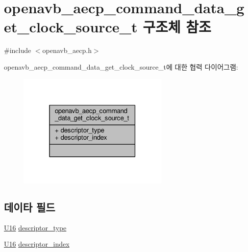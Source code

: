 \hypertarget{structopenavb__aecp__command__data__get__clock__source__t}{}\section{openavb\+\_\+aecp\+\_\+command\+\_\+data\+\_\+get\+\_\+clock\+\_\+source\+\_\+t 구조체 참조}
\label{structopenavb__aecp__command__data__get__clock__source__t}


{\ttfamily \#include $<$openavb\+\_\+aecp.\+h$>$}



openavb\+\_\+aecp\+\_\+command\+\_\+data\+\_\+get\+\_\+clock\+\_\+source\+\_\+t에 대한 협력 다이어그램\+:
\nopagebreak
\begin{figure}[H]
\begin{center}
\leavevmode
\includegraphics[width=211pt]{structopenavb__aecp__command__data__get__clock__source__t__coll__graph}
\end{center}
\end{figure}
\subsection*{데이타 필드}
\begin{DoxyCompactItemize}
\item 
\hyperlink{openavb__types__base__pub_8h_a0a0a322d5fa4a546d293a77ba8b4a71f}{U16} \hyperlink{structopenavb__aecp__command__data__get__clock__source__t_a1e231d7874aada5925b29affc76782cc}{descriptor\+\_\+type}
\item 
\hyperlink{openavb__types__base__pub_8h_a0a0a322d5fa4a546d293a77ba8b4a71f}{U16} \hyperlink{structopenavb__aecp__command__data__get__clock__source__t_ab26fb363c24b9a2a4391f9171c981b08}{descriptor\+\_\+index}
\end{DoxyCompactItemize}


